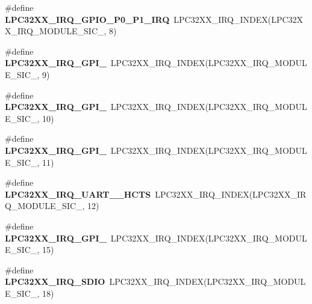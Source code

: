 \begin{DoxyCompactItemize}
\#define {\bfseries L\+P\+C32\+X\+X\+\_\+\+I\+R\+Q\+\_\+\+G\+P\+I\+O\+\_\+\+P0\+\_\+\+P1\+\_\+\+I\+RQ}~L\+P\+C32\+X\+X\+\_\+\+I\+R\+Q\+\_\+\+I\+N\+D\+EX(L\+P\+C32\+X\+X\+\_\+\+I\+R\+Q\+\_\+\+M\+O\+D\+U\+L\+E\+\_\+\+S\+I\+C\+\_, 8)
\item 
\mbox{\label{group__lpc32xx__interrupt_ga471332892ffb195a4a24948ee38b3ea9}} 
\#define {\bfseries L\+P\+C32\+X\+X\+\_\+\+I\+R\+Q\+\_\+\+G\+P\+I\+\_}~L\+P\+C32\+X\+X\+\_\+\+I\+R\+Q\+\_\+\+I\+N\+D\+EX(L\+P\+C32\+X\+X\+\_\+\+I\+R\+Q\+\_\+\+M\+O\+D\+U\+L\+E\+\_\+\+S\+I\+C\+\_, 9)
\item 
\mbox{\label{group__lpc32xx__interrupt_ga1162164960b3b1c4425495fdfc9897c5}} 
\#define {\bfseries L\+P\+C32\+X\+X\+\_\+\+I\+R\+Q\+\_\+\+G\+P\+I\+\_}~L\+P\+C32\+X\+X\+\_\+\+I\+R\+Q\+\_\+\+I\+N\+D\+EX(L\+P\+C32\+X\+X\+\_\+\+I\+R\+Q\+\_\+\+M\+O\+D\+U\+L\+E\+\_\+\+S\+I\+C\+\_, 10)
\item 
\mbox{\label{group__lpc32xx__interrupt_gade191df4862fc7934cb06c58b8bc4e3c}} 
\#define {\bfseries L\+P\+C32\+X\+X\+\_\+\+I\+R\+Q\+\_\+\+G\+P\+I\+\_}~L\+P\+C32\+X\+X\+\_\+\+I\+R\+Q\+\_\+\+I\+N\+D\+EX(L\+P\+C32\+X\+X\+\_\+\+I\+R\+Q\+\_\+\+M\+O\+D\+U\+L\+E\+\_\+\+S\+I\+C\+\_, 11)
\item 
\mbox{\label{group__lpc32xx__interrupt_ga9a06a0b877635621393055400bf97c07}} 
\#define {\bfseries L\+P\+C32\+X\+X\+\_\+\+I\+R\+Q\+\_\+\+U\+A\+R\+T\+\_\+\_\+\+H\+C\+TS}~L\+P\+C32\+X\+X\+\_\+\+I\+R\+Q\+\_\+\+I\+N\+D\+EX(L\+P\+C32\+X\+X\+\_\+\+I\+R\+Q\+\_\+\+M\+O\+D\+U\+L\+E\+\_\+\+S\+I\+C\+\_, 12)
\item 
\mbox{\label{group__lpc32xx__interrupt_ga03758992cda9cf3e589c26e38001ce03}} 
\#define {\bfseries L\+P\+C32\+X\+X\+\_\+\+I\+R\+Q\+\_\+\+G\+P\+I\+\_}~L\+P\+C32\+X\+X\+\_\+\+I\+R\+Q\+\_\+\+I\+N\+D\+EX(L\+P\+C32\+X\+X\+\_\+\+I\+R\+Q\+\_\+\+M\+O\+D\+U\+L\+E\+\_\+\+S\+I\+C\+\_, 15)
\item 
\mbox{\label{group__lpc32xx__interrupt_gaf44542cc43ff0bcad144b8e646e9fe01}} 
\#define {\bfseries L\+P\+C32\+X\+X\+\_\+\+I\+R\+Q\+\_\+\+S\+D\+IO}~L\+P\+C32\+X\+X\+\_\+\+I\+R\+Q\+\_\+\+I\+N\+D\+EX(L\+P\+C32\+X\+X\+\_\+\+I\+R\+Q\+\_\+\+M\+O\+D\+U\+L\+E\+\_\+\+S\+I\+C\+\_, 18)

\end{DoxyCompactItemize}
